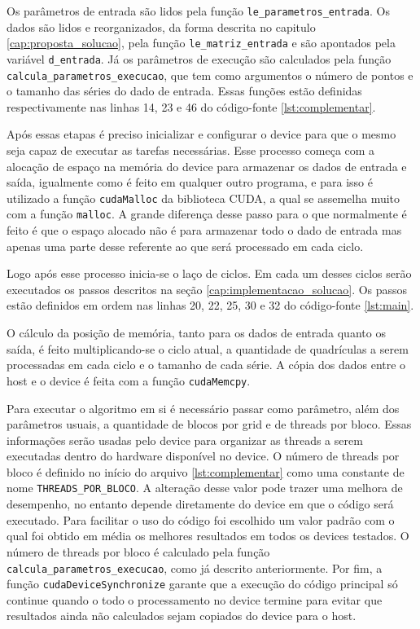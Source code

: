 Os parâmetros de entrada são lidos pela função \texttt{le\_parametros\_entrada}. Os dados são lidos e reorganizados, da forma descrita no capitulo \ref{cap:proposta_solucao}, pela função \texttt{le\_matriz\_entrada} e são apontados pela variável \texttt{d\_entrada}. Já os parâmetros de execução são calculados pela função \texttt{calcula\_parametros\_execucao}, que tem como argumentos o número de pontos e o tamanho das séries do dado de entrada. Essas funções estão definidas respectivamente nas linhas 14, 23 e 46 do código-fonte \ref{lst:complementar}.

Após essas etapas é preciso inicializar e configurar o device para que o mesmo seja capaz de executar as tarefas necessárias. Esse processo começa com a alocação de espaço na memória do device para armazenar os dados de entrada e saída, igualmente como é feito em qualquer outro programa, e para isso é utilizado a função \texttt{cudaMalloc} da biblioteca CUDA, a qual se assemelha muito com a função \texttt{malloc}. A grande diferença desse passo para o que normalmente é feito é que o espaço alocado não é para armazenar todo o dado de entrada mas apenas uma parte desse referente ao que será processado em cada ciclo.

Logo após esse processo inicia-se o laço de ciclos. Em cada um desses ciclos serão executados os passos descritos na seção \ref{cap:implementacao_solucao}. Os passos estão definidos em ordem nas linhas 20, 22, 25, 30 e 32 do código-fonte \ref{lst:main}.



O cálculo da posição de memória, tanto para os dados de entrada quanto os saída, é feito multiplicando-se o ciclo atual, a quantidade de quadrículas a serem processadas em cada ciclo e o tamanho de cada série. A cópia dos dados entre o host e o device é feita com a função \texttt{cudaMemcpy}.

Para executar o algoritmo em si é necessário passar como parâmetro, além dos parâmetros usuais, a quantidade de blocos por grid e de threads por bloco. Essas informações serão usadas pelo device para organizar as threads a serem executadas dentro do hardware disponível no device. O número de threads por bloco é definido no início do arquivo \ref{lst:complementar} como uma constante de nome \texttt{THREADS\_POR\_BLOCO}. A alteração desse valor pode trazer uma melhora de desempenho, no entanto depende diretamente do device em que o código será executado. Para facilitar o uso do código foi escolhido um valor padrão com o qual foi obtido em média os melhores resultados em todos os devices testados. O número de threads por bloco é calculado pela função \texttt{calcula\_parametros\_execucao}, como já descrito anteriormente. Por fim, a função \texttt{cudaDeviceSynchronize} garante que a execução do código principal só continue quando o todo o processamento no device termine para evitar que resultados ainda não calculados sejam copiados do device para o host.

